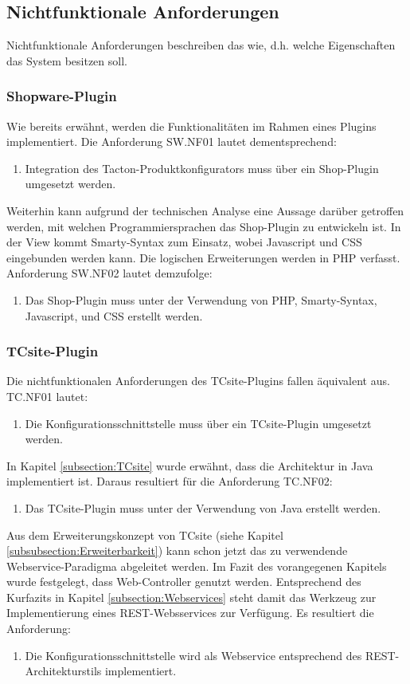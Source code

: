 \documentclass[12pt,a4paper,bibliography=totocnumbered,listof=totoc]{scrartcl}
\begin{document}
\subsection{Nichtfunktionale Anforderungen}
Nichtfunktionale Anforderungen beschreiben das \glqq wie\grqq{}, d.h. welche Eigenschaften das System besitzen soll.

\subsubsection{Shopware-Plugin}
Wie bereits erwähnt, werden die Funktionalitäten im Rahmen eines Plugins implementiert. Die Anforderung SW.NF01 lautet dementsprechend:
\begin{enumerate}[SW.NF01:]\bfseries
\item Integration des Tacton-Produktkonfigurators muss über ein Shop-Plugin umgesetzt werden.
\end{enumerate}
Weiterhin kann aufgrund der technischen Analyse eine Aussage darüber getroffen werden, mit welchen Programmiersprachen das Shop-Plugin zu entwickeln ist. In der View kommt Smarty-Syntax zum Einsatz, wobei Javascript und CSS eingebunden werden kann. Die logischen Erweiterungen werden in PHP verfasst. Anforderung SW.NF02 lautet demzufolge:
\begin{enumerate}[SW.NF02:]\bfseries
\item Das Shop-Plugin muss unter der Verwendung von PHP, Smarty-Syntax, Javascript, und CSS erstellt werden.
\end{enumerate}

\subsubsection{TCsite-Plugin}
Die nichtfunktionalen Anforderungen des TCsite-Plugins fallen äquivalent aus. TC.NF01 lautet:
\begin{enumerate}[TC.NF01:]\bfseries
\item Die Konfigurationsschnittstelle muss über ein TCsite-Plugin umgesetzt werden.
\end{enumerate}
In Kapitel \ref{subsection:TCsite} wurde erwähnt, dass die Architektur in Java implementiert ist. Daraus resultiert für die Anforderung TC.NF02:
\begin{enumerate}[TC.NF02:]\bfseries
\item Das TCsite-Plugin muss unter der Verwendung von Java erstellt werden.
\end{enumerate}
Aus dem Erweiterungskonzept von TCsite (siehe Kapitel \ref{subsubsection:Erweiterbarkeit})
 kann schon jetzt das zu verwendende Webservice-Paradigma abgeleitet werden. Im Fazit des vorangegenen Kapitels wurde festgelegt, dass Web-Controller genutzt werden. Entsprechend des Kurfazits in Kapitel \ref{subsection:Webservices} steht damit das Werkzeug zur Implementierung eines REST-Websservices zur Verfügung. Es resultiert die Anforderung:
\begin{enumerate}[TC.NF03:]\bfseries
\item Die Konfigurationsschnittstelle wird als Webservice entsprechend des REST-Architekturstils implementiert.
\end{enumerate}
\end{document}
